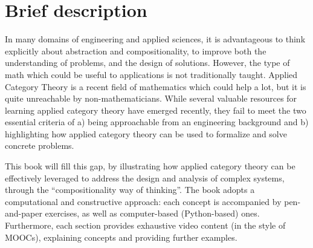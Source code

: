\documentclass[10pt, article, one side]{memoir}
\begin{document}
    \section{Brief description}
    In many domains of engineering and applied sciences, it is advantageous to think explicitly about abstraction and compositionality, to improve both the understanding of problems, and the design of solutions.
    However, the type of math which could be useful to applications is not traditionally taught.
    Applied Category Theory is a recent field of mathematics which could help a lot, but it is quite unreachable by non-mathematicians.
    While several valuable resources for learning applied category theory have emerged recently, they fail to meet the two essential criteria of a) being approachable from an engineering background and b) highlighting how applied category theory can be used to formalize and solve concrete problems.

    This book will fill this gap, by illustrating how applied category theory can be effectively leveraged to address the design and analysis of complex systems, through the “compositionality way of thinking”.
    The book adopts a computational and constructive approach: each concept is accompanied by pen-and-paper exercises, as well as computer-based (Python-based) ones.
    Furthermore, each section provides exhaustive video content (in the style of MOOCs), explaining concepts and providing further examples.
\end{document}
